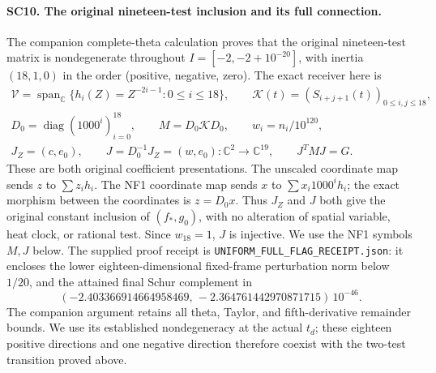 \documentclass[11pt,a4paper]{article}
\theoremstyle{definition}\newtheorem{definition}[theorem]{Definition}
\begin{document}
\paragraph{SC10. The original nineteen-test inclusion and its full connection.}
The companion complete-theta calculation proves that the
original nineteen-test matrix is nondegenerate throughout
\(I=[-2,-2+10^{-20}]\), with inertia \((18,1,0)\) in the order
(positive, negative, zero). The exact receiver here is
\[
 \begin{gathered}
 \mathcal V=\operatorname{span}_{\mathbb C}
      \{h_i(Z)=Z^{-2i-1}:0\le i\le18\},\qquad
 \mathcal K(t)=(S_{i+j+1}(t))_{0\le i,j\le18},\\
 D_0=\operatorname{diag}(1000^i)_{i=0}^{18},\qquad
 M=D_0\mathcal KD_0,\qquad w_i=n_i/10^{120},\\
 J_Z=(c,e_0),\qquad
 J=D_0^{-1}J_Z=(w,e_0)
 :\mathbb C^2\longrightarrow\mathbb C^{19},\qquad
 J^TMJ=G .
 \end{gathered}\tag{SC36}
\]
These are both original coefficient presentations. The
unscaled coordinate map sends \(z\) to \(\sum z_i h_i\).
The NF1 coordinate map sends \(x\) to
\(\sum x_i1000^i h_i\); the exact morphism between the
coordinates is \(z=D_0x\). Thus \(J_Z\) and \(J\) both give
the original constant inclusion of \((f_*,g_0)\), with no
alteration of spatial variable, heat clock, or rational test.
Since \(w_{18}=1\), \(J\) is injective. We use the NF1
symbols \(M,J\) below. The supplied proof receipt is
\texttt{UNIFORM\_FULL\_FLAG\_RECEIPT.json}: it encloses the
lower eighteen-dimensional fixed-frame perturbation norm
below \(1/20\), and the attained final Schur complement in
\[
 (-2.403366914664958469,\,-2.364761442970871715)\,10^{-46}.
 \tag{SC37}
\]
The companion argument retains all theta, Taylor, and
fifth-derivative remainder bounds. We use its established
nondegeneracy at the actual \(t_d\); these eighteen positive
directions and one negative direction therefore coexist with
the two-test transition proved above.
\end{document}
